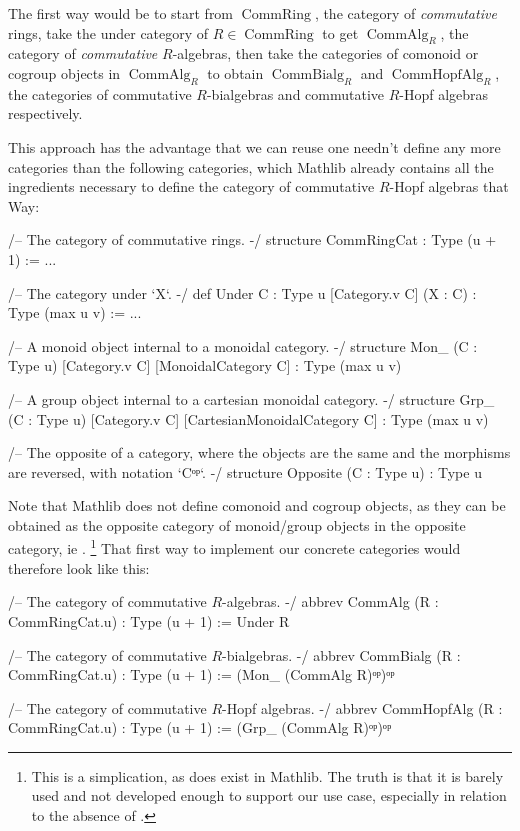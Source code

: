 \documentclass{article}
\DeclareMathOperator{\CommRing}{CommRing}
\DeclareMathOperator{\CommAlg}{CommAlg}
\DeclareMathOperator{\CommBialg}{CommBialg}
\DeclareMathOperator{\CommHopfAlg}{CommHopfAlg}
\begin{document}
The first way would be to start from $\CommRing$, the category of \emph{commutative} rings, take the under category of $R \in \CommRing$ to get $\CommAlg_R$, the category of \emph{commutative} $R$-algebras,
then take the categories of comonoid or cogroup objects in $\CommAlg_R$ to obtain $\CommBialg_R$ and $\CommHopfAlg_R$, the categories of commutative $R$-bialgebras and commutative $R$-Hopf algebras respectively.

This approach has the advantage that we can reuse one needn't define any more categories than the following categories, which Mathlib already contains all the ingredients necessary to define the category of commutative $R$-Hopf algebras that Way:

\begin{leancode}
  /-- The category of commutative rings. -/
  structure CommRingCat : Type (u + 1) := ...

  /-- The category under `X`. -/
  def Under {C : Type u} [Category.{v} C] (X : C) : Type (max u v) := ...

  /-- A monoid object internal to a monoidal category. -/
  structure Mon_ (C : Type u) [Category.{v} C] [MonoidalCategory C] : Type (max u v)

  /-- A group object internal to a cartesian monoidal category. -/
  structure Grp_ (C : Type u) [Category.{v} C] [CartesianMonoidalCategory C] : Type (max u v)

  /-- The opposite of a category, where the objects are the same and the morphisms are
  reversed, with notation `Cᵒᵖ`. -/
  structure Opposite (C : Type u) : Type u
\end{leancode}

Note that Mathlib does not define comonoid and cogroup objects, as they can be obtained as the opposite category of monoid/group objects in the opposite category, ie .
\footnote{This is a simplication, as  does exist in Mathlib.
The truth is that it is barely used and not developed enough to support our use case, especially in relation to the absence of .}
That first way to implement our concrete categories would therefore look like this:
\begin{leancode}
  /-- The category of commutative $R$-algebras. -/
  abbrev CommAlg (R : CommRingCat.{u}) : Type (u + 1) := Under R

  /-- The category of commutative $R$-bialgebras. -/
  abbrev CommBialg (R : CommRingCat.{u}) : Type (u + 1) := (Mon_ (CommAlg R)ᵒᵖ)ᵒᵖ

  /-- The category of commutative $R$-Hopf algebras. -/
  abbrev CommHopfAlg (R : CommRingCat.{u}) : Type (u + 1) := (Grp_ (CommAlg R)ᵒᵖ)ᵒᵖ
\end{leancode}
\end{document}
